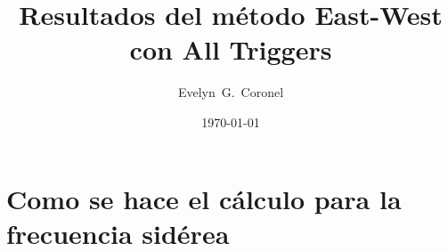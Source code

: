 

\usepackage{multirow}




\title{Resultados del método East-West con All Triggers}
\author{Evelyn~G.~Coronel}


\date[]{\lowercase{\today}} %


\maketitle

\section*{Como se hace el cálculo para la frecuencia sidérea}

